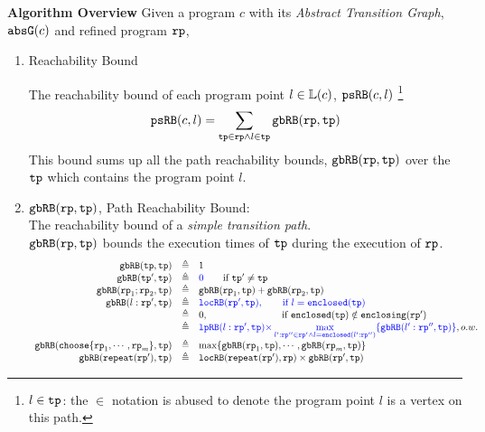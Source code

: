 \textbf{Algorithm Overview} 
Given a program $c$ with its \emph{Abstract Transition Graph}, $\mathtt{abs}{\mathtt{G}}(c)$ and refined program $\mathtt{rp}$,
\begin{enumerate}
    \item Reachability Bound
    
    The reachability bound of each program point $l \in \mathbb{L}(c)$, $\mathtt{psRB}(c, l)$
    \footnote{$l \in \mathtt{tp}$: the $\in$ notation is abused to denote
    the program point $l$ is a vertex on this path.}
   \[ 
     \mathtt{psRB}(c, l) = 
     \sum\limits_{\mathtt{tp} \in \mathtt{rp} \land 
   l \in \mathtt{tp}} 
   \mathtt{gbRB}(\mathtt{rp}, \mathtt{tp})
   \]
   This bound sums up all the path reachability bounds, $\mathtt{gbRB}(\mathtt{rp}, \mathtt{tp})$ over the $\mathtt{tp}$ which contains the program point $l$.
    \item $\mathtt{gbRB}(\mathtt{rp}, \mathtt{tp}) $, Path Reachability Bound:  
    \\
    The reachability bound of a \emph{simple transition path}.
    \\
    $\mathtt{gbRB}(\mathtt{rp}, \mathtt{tp}) $ bounds the execution times of $\mathtt{tp}$ during the execution of $\mathtt{rp}$.
%
    \[
      \begin{array}{rcl}
        \inoutB(\tpath, \tpath) & \triangleq & 1  \\
        \inoutB(\tpath', \tpath) & \triangleq & \highlight{0} \qquad \text{if } \tpath' \neq \tpath\\
        \inoutB(\rprog_1;\rprog_2, \tpath) & \triangleq & \inoutB(\rprog_1, \tpath) + \inoutB(\rprog_2, \tpath) \\
        \inoutB(l: \rprog', \tpath) & \triangleq & 
        \highlight{\outinB(\rprog', \tpath), \qquad \text{if } l = \kw{enclosed}(\tpath)}
        \\
        &  \triangleq & 
       0, \qquad \qquad \qquad \quad ~~ \text{if }  \kw{enclosed}(\tpath) \notin \kw{enclosing}(\rprog')
        \\
        &  \triangleq & 
        \highlight{
          \lpchB(l:\rprog', \tpath ) }
        \highlight{\times \max\limits_{l':\rprog'' \in \rprog' \land l = \kw{enclosed}(l':\rprog'')}
       \{\inoutB(l':\rprog'', \tpath)\} }, o.w. \\
        \inoutB(\rpchoose{\rprog_1, \cdots, \rprog_m }, \tpath) & \triangleq 
        & \max\left\{ \inoutB(\rprog_1, \tpath), \cdots, \inoutB(\rprog_m, \tpath) \right\} \\
        \inoutB(\rprepeat(\rprog'), \tpath) & \triangleq & \outinB(\rprepeat(\rprog'), \rprog) \times \inoutB(\rprog', \tpath)\\

\end{array}\]
\end{enumerate}
